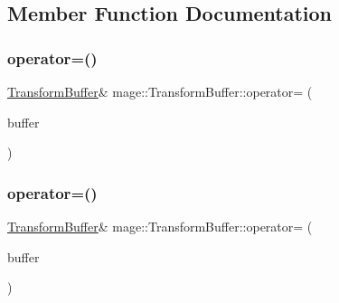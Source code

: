 \subsection{Member Function Documentation}
\hypertarget{structmage_1_1_transform_buffer_a5268ed4c7f416a54976f7ad18a1cb108}{}\label{structmage_1_1_transform_buffer_a5268ed4c7f416a54976f7ad18a1cb108} 
\subsubsection{\texorpdfstring{operator=()}{operator=()}\hspace{0.1cm}{\footnotesize\ttfamily [1/2]}}
{\footnotesize\ttfamily \hyperlink{structmage_1_1_transform_buffer}{Transform\+Buffer}\& mage\+::\+Transform\+Buffer\+::operator= (\begin{DoxyParamCaption}\item[{const \hyperlink{structmage_1_1_transform_buffer}{Transform\+Buffer} \&}]{buffer }\end{DoxyParamCaption})\hspace{0.3cm}{\ttfamily [default]}}

\hypertarget{structmage_1_1_transform_buffer_a9fb3da35649fe9d023a061ad707fc0fc}{}\label{structmage_1_1_transform_buffer_a9fb3da35649fe9d023a061ad707fc0fc} 
\subsubsection{\texorpdfstring{operator=()}{operator=()}\hspace{0.1cm}{\footnotesize\ttfamily [2/2]}}
{\footnotesize\ttfamily \hyperlink{structmage_1_1_transform_buffer}{Transform\+Buffer}\& mage\+::\+Transform\+Buffer\+::operator= (\begin{DoxyParamCaption}\item[{\hyperlink{structmage_1_1_transform_buffer}{Transform\+Buffer} \&\&}]{buffer }\end{DoxyParamCaption})\hspace{0.3cm}{\ttfamily [default]}}

\hypertarget{structmage_1_1_transform_buffer_ab9d62cf4fc2332242333b4649779e706}{}\label{structmage_1_1_transform_buffer_ab9d62cf4fc2332242333b4649779e706} 
